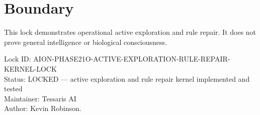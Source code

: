 \documentclass[11pt,a4paper]{article}
\begin{document}
\section{Boundary}

This lock demonstrates operational active exploration and rule repair. It does not prove general intelligence or biological consciousness.

\bigskip

\noindent
Lock ID: AION-PHASE21O-ACTIVE-EXPLORATION-RULE-REPAIR-KERNEL-LOCK\\
Status: LOCKED --- active exploration and rule repair kernel implemented and tested\\
Maintainer: Tessaris AI\\
Author: Kevin Robinson.
\end{document}
